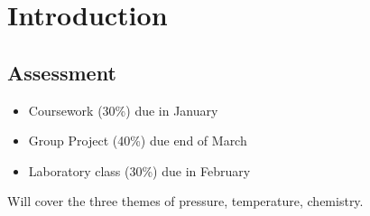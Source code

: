 \documentclass[class=report, crop=false, 12pt,a4paper]{standalone}
\begin{document}
\section{Introduction}
\subsection{Assessment}
\begin{itemize}
	\item Coursework (30\%) due in January
	\item Group Project (40\%) due end of March
	\item Laboratory class (30\%) due in February
\end{itemize}
Will cover the three themes of pressure, temperature, chemistry. 
\end{document}
